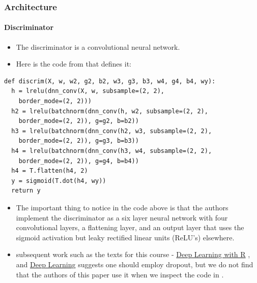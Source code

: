 \documentclass{beamer}
\begin{document}
\begin{frame}
\frametitle{Architecture}
\framesubtitle{Discriminator}
\begin{itemize}
\item The discriminator is a convolutional neural network. 
\item Here is the code from \cite{dcganCode} that defines it:
\end{itemize}
\begin{tiny}
\begin{lstlisting}
def discrim(X, w, w2, g2, b2, w3, g3, b3, w4, g4, b4, wy):
  h = lrelu(dnn_conv(X, w, subsample=(2, 2), 
    border_mode=(2, 2)))
  h2 = lrelu(batchnorm(dnn_conv(h, w2, subsample=(2, 2), 
    border_mode=(2, 2)), g=g2, b=b2))
  h3 = lrelu(batchnorm(dnn_conv(h2, w3, subsample=(2, 2), 
    border_mode=(2, 2)), g=g3, b=b3))
  h4 = lrelu(batchnorm(dnn_conv(h3, w4, subsample=(2, 2), 
    border_mode=(2, 2)), g=g4, b=b4))
  h4 = T.flatten(h4, 2)
  y = sigmoid(T.dot(h4, wy))
  return y
\end{lstlisting}
\end{tiny}
\begin{small}
\begin{itemize}
  \item 
    The important thing to notice in the code above is that the authors implement 
    the discriminator as a six layer neural network with four convolutional layers,
    a flattening layer, and an output layer that uses the sigmoid activation but 
    leaky rectified linear units (ReLU's) elsewhere.
 \item subsequent work such as the texts for this course  - \underline{Deep
   Learning with R} \cite{deepLearnR}, and \underline{ Deep Learning} 
   \cite{deepLearnBookGenCh} suggests one should employ dropout, but we do not find 
that the authors of this paper use it  when we inspect the code in \cite{dcganCode}.
\end{itemize}
\end{small}
\end{frame}

\end{document}

